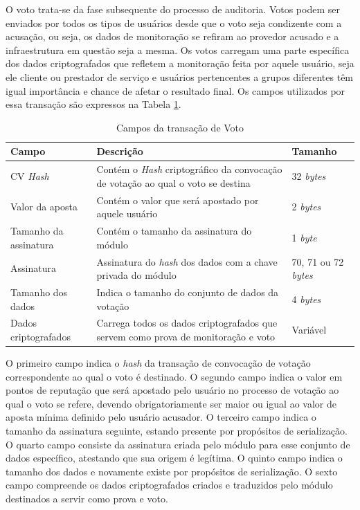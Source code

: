 O voto trata-se da fase subsequente do processo de auditoria. Votos podem ser enviados por todos os tipos de usuários desde que o voto seja condizente com a acusação, ou seja, os dados de monitoração se refiram ao provedor acusado e a infraestrutura em questão seja a mesma. Os votos carregam uma parte específica dos dados criptografados que refletem a monitoração feita por aquele usuário, seja ele cliente ou prestador de serviço e usuários pertencentes a grupos diferentes têm igual importância e chance de afetar o resultado final. Os campos utilizados por essa transação são expressos na Tabela \ref{tabela:voto}.

\begin{table}[ht]
\centering
    \begin{tabular}{|m{}|m{}|m{}|}
    \hline
         \textbf{Campo} & \textbf{Descrição} & \textbf{Tamanho}  \\
         \hline
         \ac{CV} \textit{Hash} & Contém o \textit{Hash} criptográfico da convocação de votação ao qual o voto se destina & 32 \textit{bytes} \\
         \hline
         Valor da aposta & Contém o valor que será apostado por aquele usuário & 2 \textit{bytes} \\
         \hline
         Tamanho da assinatura & Contém o tamanho da assinatura do módulo & 1 \textit{byte} \\
         \hline
         Assinatura & Assinatura do \textit{hash} dos dados com a chave privada do módulo & 70, 71 ou 72 \textit{bytes} \\
         \hline
         Tamanho dos dados & Indica o tamanho do conjunto de dados da votação & 4 \textit{bytes} \\
         \hline
         Dados criptografados & Carrega todos os dados criptografados que servem como prova de monitoração e voto & Variável \\
    \hline
    \end{tabular}
    \caption{Campos da transação de Voto}
    \label{tabela:voto}
\end{table}

O primeiro campo indica o \textit{hash} da transação de convocação de votação correspondente ao qual o voto é destinado. O segundo campo indica o valor em pontos de reputação que será apostado pelo usuário no processo de votação ao qual o voto se refere, devendo obrigatoriamente ser maior ou igual ao valor de aposta mínima definido pelo usuário acusador. O terceiro campo indica o tamanho da assinatura seguinte, estando presente por propósitos de serialização. O quarto campo consiste da assinatura criada pelo módulo para esse conjunto de dados específico, atestando que sua origem é legítima. O quinto campo indica o tamanho dos dados e novamente existe por propósitos de serialização. O sexto campo compreende os dados criptografados criados e traduzidos pelo módulo destinados a servir como prova e voto.

